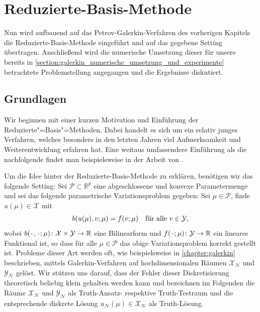 \documentclass[../main.tex]{subfiles}
\begin{document}
\chapter{Reduzierte-Basis-Methode} %
\label{chapter:rbm}


Nun wird aufbauend auf das Petrov-Galerkin-Verfahren des vorherigen Kapitels die Reduzierte-Basis-Methode eingeführt und auf das gegebene Setting übertragen.
Anschließend wird die numerische Umsetzung dieser für unsere bereits in \cref{section:galerkin_numerische_umsetzung_und_experimente} betrachtete Problemstellung angegangen und die Ergebnisse diskutiert.

\section{Grundlagen} %
\label{sub:grb:rb:grundlagen}

Wir beginnen mit einer kurzen Motivation und Einführung der Reduzierte"=Basis"=Methoden.
Dabei handelt es sich um ein relativ junges Verfahren, welches besonders in den letzten Jahren viel Aufmerksamkeit und Weiterentwicklung erfahren hat.
Eine weitaus umfassendere Einführung als die nachfolgende findet man beispielsweise in der Arbeit von \textcite{Patera:2007un}.

Um die Idee hinter der Reduzierte-Basis-Methode zu erklären, benötigen wir das folgende Setting: Sei $\mathcal P \subset \mathbb{R}^{p}$ eine abgeschlossene und konvexe Parametermenge und sei das folgende parametrische Variationsproblem gegeben:
Sei $\mu \in \mathcal P$, finde $u(\mu) \in \mathcal X$ mit
\begin{equation}
    \label{eq:rbm_varprob_allgemein}
    b(u(\mu), v; \mu) = f(v; \mu) \quad \fa v \in \mathcal Y,
\end{equation}
wobei $b({\mkern2mu\cdot\mkern2mu}, {\mkern2mu\cdot\mkern2mu}; \mu) \colon \mathcal X \times \mathcal Y \to \mathbb{R}$ eine Bilinearform und $f({\mkern2mu\cdot\mkern2mu}; \mu) \colon \mathcal Y \to \mathbb{R}$ ein lineares Funktional ist, so dass für alle $\mu \in \mathcal P$ das obige Variationsproblem korrekt gestellt ist.
Probleme dieser Art werden oft, wie beispielsweise in \cref{chapter:galerkin} beschrieben, mittels Galerkin-Verfahren auf hochdimensionalen Räumen $\mathcal X_{\mathcal N}$ und $\mathcal Y_{\mathcal N}$ gelöst.
Wir stützen uns darauf, dass der Fehler dieser Diskretisierung theoretisch beliebig klein gehalten werden kann und bezeichnen im Folgenden die Räume $\mathcal X_{\mathcal N}$ und $\mathcal Y_{\mathcal N}$ als Truth-Ansatz- respektive Truth-Testraum und die entsprechende diskrete Lösung $u_{\mathcal N}(\mu) \in \mathcal X_{\mathcal N}$ als Truth-Lösung.
\end{document}
